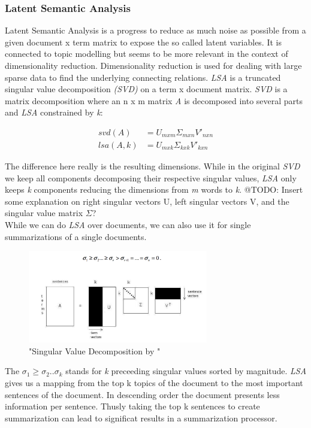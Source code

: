     \subsubsection{Latent Semantic Analysis}
      Latent Semantic Analysis is a progress to reduce as much noise as possible from a given document x term matrix to expose the so called latent variables. It is connected to topic modelling but seems to be more relevant in the context of dimensionality reduction. Dimensionality reduction is used for dealing with large sparse data to find the underlying connecting relations. \emph{LSA} is a truncated singular value decomposition \emph{(SVD)} on a term x document matrix. \emph{SVD} is a matrix decomposition where an n x m matrix \emph{A} is decomposed into several parts and \emph{LSA} constrained by \emph{k}:

      \begin{align*}
        svd(A) &= U_{mxm}\Sigma_{mxn} V'_{nxn} \\
        lsa(A, k) &= U_{mxk}\Sigma_{kxk} V'_{kxn}
      \end{align*}

      The difference here really is the resulting dimensions. While in the original \emph{SVD} we keep all components decomposing their respective singular values, \emph{LSA} only keeps \emph{k} components reducing the dimensions from \emph{m} words to \emph{k}. @TODO: Insert some explanation on right singular vectors U, left singular vectors V, and the singular value matrix $\Sigma$?\\
      While we can do \emph{LSA} over documents, we can also use it for single summarizations of a single documents.

      \begin{figure}[h!]
        \centering
          \includegraphics[width=0.7\textwidth]{svd_lsa.png}
          \caption{"Singular Value Decomposition by \cite{SumLSASteinberger2004}"}
          \label{svd_lsa}
      \end{figure}

      The $\sigma_1 \geq \sigma_2..\sigma_k$ stands for \emph{k} preceeding singular values sorted by magnitude. \emph{LSA} gives us a mapping from the top k topics of the document to the most important sentences of the document. In descending order the document presents less information per sentence. Thusly taking the top k sentences to create summarization can lead to significat results in a summarization processor. \cite{SumLSASteinberger2004}\\

